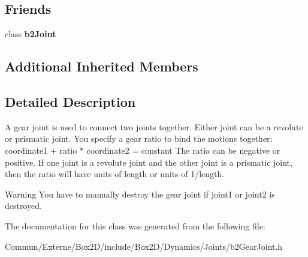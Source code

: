 \subsection*{Friends}
\begin{DoxyCompactItemize}
\item 
class {\bfseries b2\+Joint}\hypertarget{classb2_gear_joint_a54ade8ed3d794298108d7f4c4e4793fa}{}\label{classb2_gear_joint_a54ade8ed3d794298108d7f4c4e4793fa}

\end{DoxyCompactItemize}
\subsection*{Additional Inherited Members}


\subsection{Detailed Description}
A gear joint is used to connect two joints together. Either joint can be a revolute or prismatic joint. You specify a gear ratio to bind the motions together\+: coordinate1 + ratio $\ast$ coordinate2 = constant The ratio can be negative or positive. If one joint is a revolute joint and the other joint is a prismatic joint, then the ratio will have units of length or units of 1/length. \begin{DoxyWarning}{Warning}
You have to manually destroy the gear joint if joint1 or joint2 is destroyed. 
\end{DoxyWarning}


The documentation for this class was generated from the following file\+:\begin{DoxyCompactItemize}
\item 
Commun/\+Externe/\+Box2\+D/include/\+Box2\+D/\+Dynamics/\+Joints/b2\+Gear\+Joint.\+h\end{DoxyCompactItemize}
